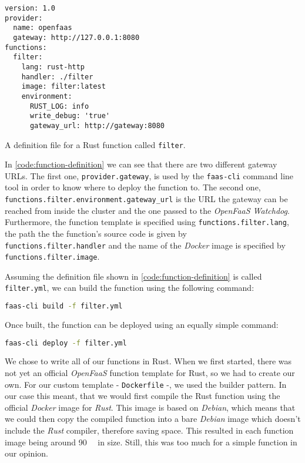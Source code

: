 \begin{code}[H]
  \centering
  \begin{lstlisting}
version: 1.0
provider:
  name: openfaas
  gateway: http://127.0.0.1:8080
functions:
  filter:
    lang: rust-http
    handler: ./filter
    image: filter:latest
    environment:
      RUST_LOG: info
      write_debug: 'true'
      gateway_url: http://gateway:8080
  \end{lstlisting}
  \caption{A definition file for a Rust function called \texttt{filter}.}
  \label{code:function-definition}
\end{code}

In \autoref{code:function-definition} we can see that there are two different gateway URLs. The first
one, \texttt{provider.gateway}, is used by the \texttt{faas-cli} command line tool in order to know
where to deploy the function to. The second one, \texttt{functions.filter.environment.gateway\_url}
is the URL the gateway can be reached from inside the cluster and the one passed to the
\textit{OpenFaaS Watchdog}. Furthermore, the function template is specified using
\texttt{functions.filter.lang}, the path the the function's source code is given by \\
\texttt{functions.filter.handler} and the name of the \textit{Docker} image is specified by \\
\texttt{functions.filter.image}.

Assuming the definition file shown in \autoref{code:function-definition} is called
\texttt{filter.yml}, we can build the function using the following command:

\begin{lstlisting}[language=bash]
faas-cli build -f filter.yml
\end{lstlisting}

Once built, the function can be deployed using an equally simple command:

\begin{lstlisting}[language=bash]
faas-cli deploy -f filter.yml
\end{lstlisting}

We chose to write all of our functions in Rust. When we first started, there was not yet an official
\textit{OpenFaaS} function template for Rust, so we had to create our own. For our custom template -
\texttt{Dockerfile} -, we used the builder pattern. In our case this meant, that we would first
compile the Rust function using the official \textit{Docker} image for \textit{Rust}. This image is
based on \textit{Debian}, which means that we could then copy the compiled function into a bare
\textit{Debian} image which doesn't include the \textit{Rust} compiler, therefore saving space. This
resulted in each function image being around \SI{90}{\mega\byte} in size. Still, this was too much
for a simple function in our opinion.

